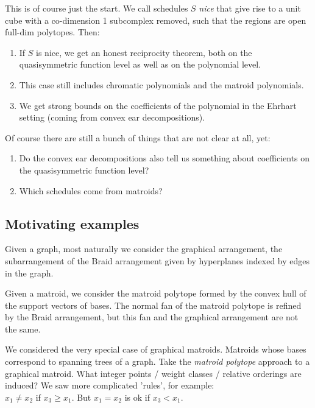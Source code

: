\documentclass[11pt,letter]{amsart}
\newcommand{\defn}[1]{\emph{#1}}
\begin{document}
This is of course just the start. We call schedules $S$ \defn{nice} that give rise to a unit cube with a co-dimension 1 subcomplex removed, such that the regions are open full-dim polytopes. Then:
\begin{enumerate}
\item If $S$ is nice, we get an honest reciprocity theorem, both on the quasisymmetric function level as well as on the polynomial level.
\item This case still includes chromatic polynomials and the matroid polynomials.
\item We get strong bounds on the coefficients of the polynomial in the Ehrhart setting (coming from convex ear decompositions).
\end{enumerate}

Of course there are still a bunch of things that are not clear at all, yet:
\begin{enumerate} 
\item Do the convex ear decompositions also tell us something about coefficients on the quasisymmetric function level?
\item Which schedules come from matroids? 
\end{enumerate}



\subsection{Motivating examples}

Given a graph, most naturally we consider the graphical arrangement,
the subarrangement of the Braid arrangement given by hyperplanes
indexed by edges in the graph.

Given a matroid, we consider the matroid polytope formed by the convex
hull of the support vectors of bases.  The normal fan of the matroid
polytope is refined by the Braid arrangement, but this fan and the
graphical arrangement are not the same.  

We considered the very special case of graphical matroids.  Matroids
whose bases correspond to spanning trees of a graph.  Take the
\emph{matroid polytope} approach to a graphical matroid.  What integer
points / weight classes / relative orderings are induced?  We saw more
complicated 'rules', for example:\\

$x_1 \neq x_2$ if $x_3 \geq x_1$.  But $x_1 = x_2$ is ok if $x_3 < x_1$.\\
\end{document}

